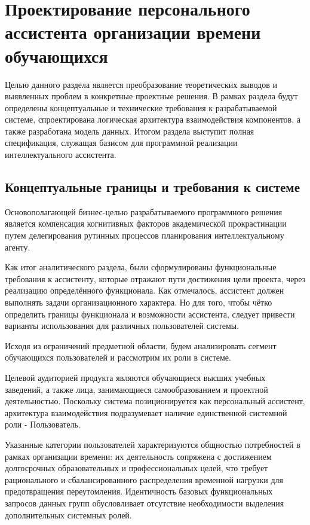 \section{Проектирование персонального ассистента организации времени обучающихся}
\label{sec:designing}

Целью данного раздела является преобразование теоретических выводов и выявленных проблем в конкретные проектные решения. В рамках раздела будут определены концептуальные и технические требования к разрабатываемой системе, спроектирована логическая архитектура взаимодействия компонентов, а также разработана модель данных. Итогом раздела выступит полная спецификация, служащая базисом для программной реализации интеллектуального ассистента.

\subsection{Концептуальные границы и требования к системе}

Основополагающей бизнес-целью разрабатываемого программного решения является компенсация когнитивных факторов академической прокрастинации путем делегирования рутинных процессов планирования интеллектуальному агенту.

Как итог аналитического раздела, были сформулированы функциональные требования к ассистенту, которые отражают пути достижения цели проекта, через реализацию определённого функционала. Как отмечалось, ассистент должен выполнять задачи организационного характера. Но для того, чтобы чётко определить границы функционала и возможности ассистента, следует привести варианты использования для различных пользователей системы. 

Исходя из ограничений предметной области, будем анализировать сегмент обучающихся пользователей и рассмотрим их роли в системе.

\numberedparagraph
Целевой аудиторией продукта являются обучающиеся высших учебных заведений, а также лица, занимающиеся самообразованием и проектной деятельностью. Поскольку система позиционируется как персональный ассистент, архитектура взаимодействия подразумевает наличие единственной системной роли - Пользователь.

Указанные категории пользователей характеризуются общностью потребностей в рамках организации времени: их деятельность сопряжена с достижением долгосрочных образовательных и профессиональных целей, что требует рационального и сбалансированного распределения временной нагрузки для предотвращения переутомления. Идентичность базовых функциональных запросов данных групп обусловливает отсутствие необходимости выделения дополнительных системных ролей.

